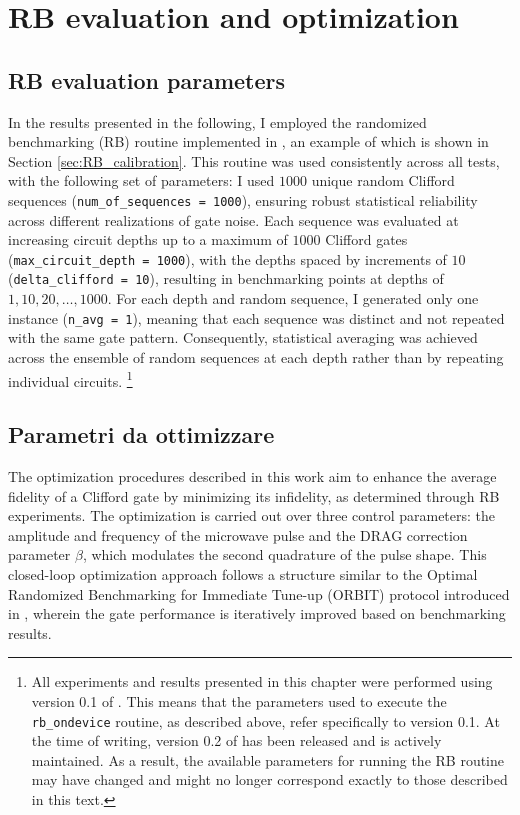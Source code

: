 \section{RB evaluation and optimization}

\subsection{RB evaluation parameters}\label{sec:RB_parameters}
In the results presented in the following, I employed the randomized benchmarking (RB) routine implemented in \Qibocal, an example of which is shown in Section \ref{sec:RB_calibration}. 
This routine was used consistently across all tests, with the following set of parameters: I used $1000$ unique random Clifford sequences (\texttt{num\_of\_sequences = 1000}), ensuring robust statistical reliability across different realizations of gate noise. 
Each sequence was evaluated at increasing circuit depths up to a maximum of $1000$ Clifford gates (\texttt{max\_circuit\_depth = 1000}), with the depths spaced by increments of $10$ (\texttt{delta\_clifford = 10}), resulting in benchmarking points at depths of $1, 10, 20, \ldots, 1000$. 
For each depth and random sequence, I generated only one instance (\texttt{n\_avg = 1}), meaning that each sequence was distinct and not repeated with the same gate pattern. 
Consequently, statistical averaging was achieved across the ensemble of random sequences at each depth rather than by repeating individual circuits. 
\footnote{All experiments and results presented in this chapter were performed using version 0.1 of \Qibocal. This means that the parameters used to execute the \texttt{rb\_ondevice} routine, as described above, refer specifically to version 0.1. At the time of writing, version 0.2 of \Qibocal has been released and is actively maintained. As a result, the available parameters for running the RB routine may have changed and might no longer correspond exactly to those described in this text.}

\subsection{Parametri da ottimizzare}

The optimization procedures described in this work aim to enhance the average fidelity of a Clifford gate by minimizing its infidelity, as determined through RB experiments. 
The optimization is carried out over three control parameters: the amplitude and frequency of the microwave pulse and the DRAG correction parameter $\beta$, which modulates the second quadrature of the pulse shape. 
This closed-loop optimization approach follows a structure similar to the Optimal Randomized Benchmarking for Immediate Tune-up (ORBIT) protocol introduced in \cite{kelly_optimal_2014}, wherein the gate performance is iteratively improved based on benchmarking results.

